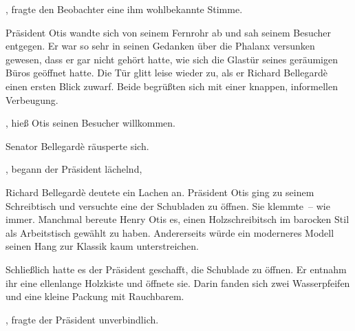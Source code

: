 \par

, fragte den Beobachter eine ihm wohlbekannte Stimme.

\par

Präsident Otis wandte sich von seinem Fernrohr ab und sah seinem Besucher entgegen. Er war so sehr in seinen Gedanken über die Phalanx versunken gewesen, dass er gar nicht gehört hatte, wie sich die Glastür seines geräumigen Büros geöffnet hatte. Die Tür glitt leise wieder zu, als er Richard Bellegardè einen ersten Blick zuwarf. Beide begrüßten sich mit einer knappen, informellen Verbeugung.

\par

, hieß Otis seinen Besucher willkommen. 

\par

Senator Bellegardè räusperte sich. 

\par

, begann der Präsident lächelnd, 

\par

Richard Bellegardè deutete ein Lachen an. Präsident Otis ging zu seinem Schreibtisch und versuchte eine der Schubladen zu öffnen. Sie klemmte~-- wie immer. Manchmal bereute Henry Otis es, einen Holzschreibitsch im barocken Stil als Arbeitstisch gewählt zu haben. Andererseits würde ein moderneres Modell seinen Hang zur Klassik kaum unterstreichen.

\par

Schließlich hatte es der Präsident geschafft, die Schublade zu öffnen. Er entnahm ihr eine ellenlange Holzkiste und öffnete sie. Darin fanden sich zwei Wasserpfeifen und eine kleine Packung mit Rauchbarem.

\par

, fragte der Präsident unverbindlich.

